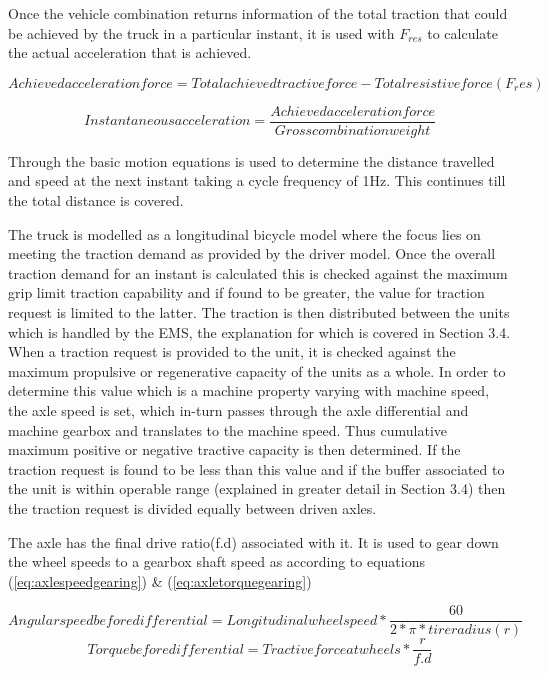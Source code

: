 \documentclass[ExampleMasters.tex]{subfiles}
\begin{document}
Once the vehicle combination returns information of the total traction that could be achieved by the truck in a particular instant, it is used with $F_{res}$ to calculate the actual acceleration that is achieved.
 
\begin{equation} \label{eq:acclforce}
Achieved acceleration force=Total achieved tractive force-Total resistive force(F_res)
\end{equation} 

\begin{equation} \label{eq:acclinstant}
Instantaneous acceleration=\frac{Achieved acceleration force}{Gross combination weight}
\end{equation} 

Through the basic motion equations is used to determine the distance travelled and speed at the next instant taking a cycle frequency of 1Hz. This continues till the total distance is covered. 

The truck is modelled as a longitudinal bicycle model where the focus lies on meeting the traction demand as provided by the driver model. Once the overall traction demand for an instant is calculated this is checked against the maximum grip limit traction capability and if found to be greater, the value for traction request is limited to the latter. The traction is then distributed between the units which is handled by the EMS, the explanation for which is covered in Section 3.4. When a traction request is provided to the unit, it is checked against the maximum propulsive or regenerative capacity of the units as a whole. In order to determine this value which is a machine property varying with machine speed, the axle speed is set, which in-turn passes through the axle differential and machine gearbox and translates to the machine speed. Thus cumulative maximum positive or negative tractive capacity is then determined. If the traction request is found to be less than this value and if the buffer associated to the unit is within operable range (explained in greater detail in Section 3.4) then the traction request is divided equally between driven axles.

The axle has the final drive ratio(f.d) associated with it. It is used to gear down the wheel speeds to a gearbox shaft speed as according to equations (\ref{eq:axlespeedgearing}) \&  (\ref{eq:axletorquegearing})

\begin{equation} \label{eq:axlespeedgearing}
Angular speed before differential =Longitudinal wheel speed*\frac{60}{2*\pi*tire radius(r)}
\end{equation}
\begin{equation} \label{eq:axletorquegearing}
Torque before differential =Tractive force at wheels*\frac{r}{f.d} 
\end{equation}
\end{document}
